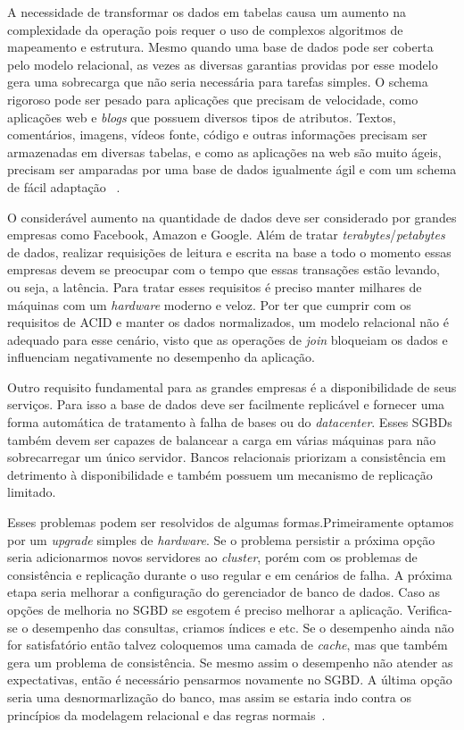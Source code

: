A necessidade de transformar os dados em tabelas causa um aumento na complexidade da operação pois requer o uso de complexos algoritmos de mapeamento e estrutura. Mesmo quando uma base de dados pode ser coberta pelo modelo relacional, as vezes as diversas garantias providas por esse modelo gera uma sobrecarga que não seria necessária para tarefas simples. O schema rigoroso pode ser pesado para aplicações que precisam de velocidade, como aplicações web e \textit{blogs} que possuem diversos tipos de atributos. Textos, comentários, imagens, vídeos fonte, código e outras informações precisam ser armazenadas em diversas tabelas, e como as aplicações na web são muito ágeis, precisam ser amparadas por uma base de dados igualmente ágil e com um schema de fácil adaptação ~\cite{nosqlevaluation}.

O considerável aumento na quantidade de dados deve ser considerado por grandes empresas como Facebook, Amazon e Google. Além de tratar \textit{terabytes}/\textit{petabytes} de dados, realizar requisições de leitura e escrita na base a todo o momento essas empresas devem se preocupar com o tempo que essas transações estão levando, ou seja, a latência. Para tratar esses requisitos é preciso manter milhares de máquinas com um \textit{hardware} moderno e veloz. Por ter que cumprir com os requisitos de ACID e manter os dados normalizados, um modelo relacional não é adequado para esse cenário, visto que as operações de \textit{join} bloqueiam os dados e influenciam negativamente no desempenho da aplicação.

Outro requisito fundamental para as grandes empresas é a disponibilidade de seus serviços. Para isso a base de dados deve ser facilmente replicável e fornecer uma forma automática de tratamento à falha de bases ou do \textit{datacenter}. Esses SGBDs também devem ser capazes de balancear a carga em várias máquinas para não sobrecarregar um único servidor. Bancos relacionais priorizam a consistência em detrimento à disponibilidade e também possuem um mecanismo de replicação limitado.

Esses problemas podem ser resolvidos de algumas formas.Primeiramente optamos por um \textit{upgrade} simples de \textit{hardware}. Se o problema persistir a próxima opção seria adicionarmos novos servidores ao \textit{cluster}, porém com os problemas de consistência e replicação durante o uso regular e em cenários de falha. A próxima etapa seria melhorar a configuração do gerenciador de banco de dados. Caso as opções de melhoria no SGBD se esgotem é preciso melhorar a aplicação. Verifica-se o desempenho das consultas, criamos índices e etc. Se o desempenho ainda não for satisfatório então talvez coloquemos uma camada de \textit{cache}, mas que também gera um problema de consistência. Se mesmo assim o desempenho não atender as expectativas, então é necessário pensarmos novamente no SGBD. A última opção seria uma desnormarlização do banco, mas assim se estaria indo contra os princípios da modelagem relacional e das regras normais~\cite{cassandraguide}.

